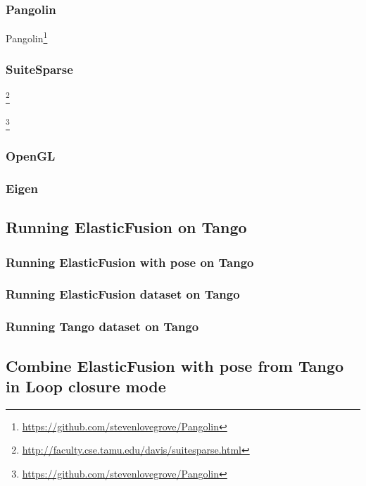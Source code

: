 \documentclass[12pt,twoside]{article}
\begin{document}
\subsubsection{Pangolin}

Pangolin\footnote{\url{https://github.com/stevenlovegrove/Pangolin}} 


\subsubsection{SuiteSparse}

\footnote{\url{http://faculty.cse.tamu.edu/davis/suitesparse.html}} 

\footnote{\url{https://github.com/stevenlovegrove/Pangolin}} 

\subsubsection{OpenGL}



\subsubsection{Eigen}



\newpage



\subsection{Running ElasticFusion on Tango}

\subsubsection{Running ElasticFusion with pose on Tango}

\subsubsection{Running ElasticFusion dataset on Tango}

\subsubsection{Running Tango dataset on Tango}

\newpage



\subsection{Combine ElasticFusion with pose from Tango in Loop closure mode}
\end{document}
